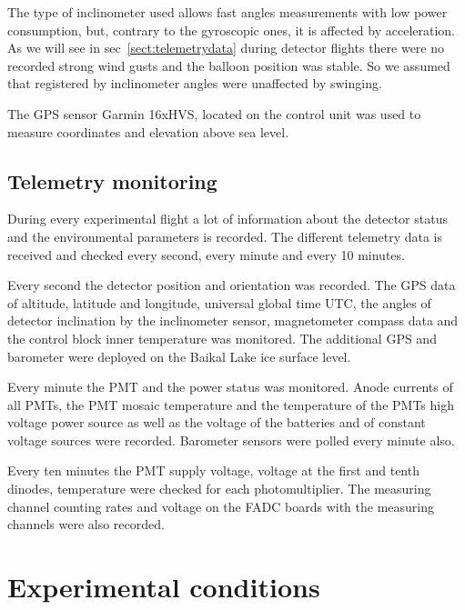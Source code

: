 \documentclass[final,5p,times,twocolumn]{elsarticle}
\begin{document}
The type of inclinometer used allows fast angles measurements with low power consumption, but, contrary to the gyroscopic ones, it is affected by acceleration. As we will see in sec~\ref{sect:telemetrydata} during detector flights there were no recorded strong wind gusts and the balloon position was stable. So we assumed that  registered by inclinometer angles were unaffected by swinging.

The GPS sensor Garmin 16xHVS, located on the control unit was used to measure coordinates and elevation above sea level.



\subsection{Telemetry monitoring\label{sect:telemetry}}


During every experimental flight a lot of information about the detector status and the environmental parameters is recorded. The different telemetry data is received and checked every second, every minute and every 10 minutes. 

Every second the detector position and orientation was recorded. The GPS data of altitude, latitude and longitude, universal global time UTC, the angles of detector inclination by the inclinometer sensor, magnetometer compass data and the control block inner temperature was monitored. The additional GPS and barometer were deployed on the Baikal Lake ice surface level.

Every minute the PMT and the power status was monitored. Anode currents of all PMTs, the PMT mosaic temperature and the temperature of the PMTs high voltage power source as well as the voltage of the batteries and of constant voltage sources were recorded. Barometer sensors were polled every minute also.

Every ten minutes the PMT supply voltage, voltage at the first and tenth dinodes, temperature were checked for each photomultiplier. The measuring channel counting rates and voltage on the FADC boards with the measuring channels were also recorded.

\section{Experimental conditions}
\label{sect:data}
 
\end{document}
